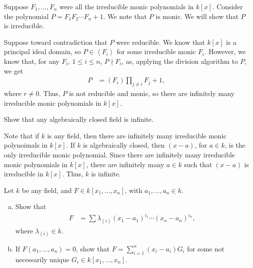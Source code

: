 \documentclass[10pt]{mypackage}
\begin{document}
\begin{solution}
  Suppose $F_1,\dots,F_n$ were all the irreducible monic polynomials in $k\left[x\right]$. Consider the polynomial $P = F_1F_2\cdots F_n + 1$. We note that $P$ is monic. We will show that $P$ is irreducible.\newline

  Suppose toward contradiction that $P$ were reducible. We know that $k\left[x\right]$ is a principal ideal domain, so $P\in \left\langle F_i \right\rangle$ for some irreducible monic $F_i$. However, we know that, for any $F_i$, $1\leq i\leq n$, $P \nmid F_i$, as, applying the division algorithm to $P$, we get
  \begin{align*}
    P &= \left(F_i\right)\prod_{j\neq i}F_j + 1,
  \end{align*}
  where $r \neq 0$. Thus, $P$ is not reducible and monic, so there are infinitely many irreducible monic polynomials in $k\left[x\right]$.
\end{solution}

\begin{exercise}[Exercise 1.6]
Show that any algebraically closed field is infinite.
\end{exercise}
\begin{solution}
  Note that if $k$ is any field, then there are infinitely many irreducible monic polynoimals in $k\left[x\right]$. If $k$ is algebraically closed, then $\left(x-a\right)$, for $a\in k$, is the only irreducible monic polynomial. Since there are infinitely many irreducible monic polynomials in $k\left[x\right]$, there are infinitely many $a\in k$ such that $\left(x-a\right)$ is irreducible in $k\left[x\right]$. Thus, $k$ is infinite.
\end{solution}

\begin{exercise}[Exercise 1.7]
Let $k$ be any field, and $F\in k\left[x_1,\dots,x_n\right]$, with $a_1,\dots,a_n\in k$.
\begin{enumerate}[(a)]
  \item Show that
    \begin{align*}
      F &= \sum\lambda_{(i)}\left(x_1-a_1\right)^{i_1}\cdots \left(x_n-a_n\right)^{i_n},
    \end{align*}
    where $\lambda_{(i)}\in k$.
  \item If $F\left(a_1,\dots,a_n\right) = 0$, show that $F = \sum_{i=1}^{n}\left(x_i - a_i\right)G_i$ for some not necessarily unique $G_i\in k\left[x_1,\dots,x_n\right]$.
\end{enumerate}
\end{exercise}
\end{document}

